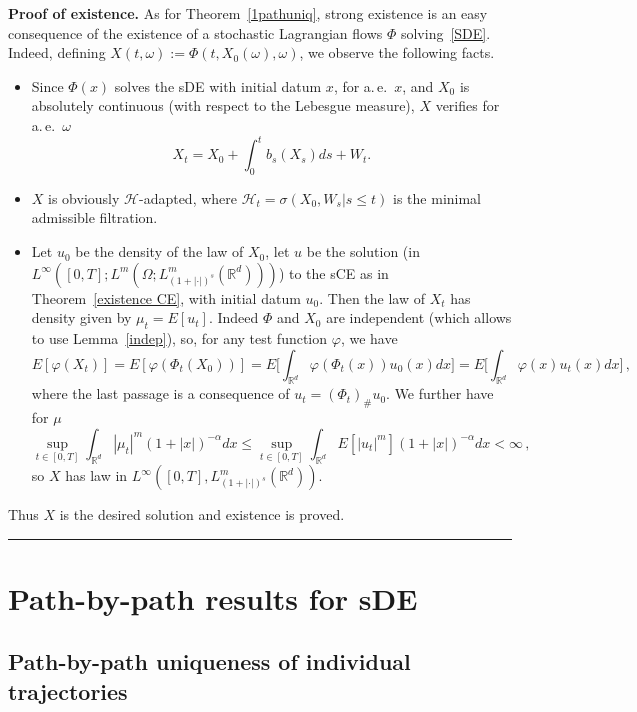 \documentclass[a4paper,10pt]{article}
\newenvironment{proof}[1][Proof]{\noindent\textbf{#1.} }{\ \rule{0.5em}{0.5em}}
\newcommand{\mr}{\mathbb{R}}
\newcommand{\mc}{\mathcal}
\begin{document}
\begin{proof}[Proof of existence]
As for Theorem~\ref{1pathuniq}, strong existence is an easy consequence of the existence of a stochastic Lagrangian flows $\Phi$ solving~\eqref{SDE}. Indeed, defining $X(t,\omega):=\Phi(t,X_0(\omega),\omega)$, we observe the following facts.
\begin{itemize}
\item Since $\Phi(x)$ solves the sDE with initial datum $x$, for a.\,e.\ $x$, and $X_0$ is absolutely continuous (with respect to the Lebesgue measure), $X$ verifies for a.\,e.\ $\omega$
\begin{equation*}
X_t=X_0+\int^t_0b_s (X_s)ds+W_t.
\end{equation*}
\item $X$ is obviously $\mc{H}$-adapted, where $\mc{H}_t=\sigma(X_0,W_s|s\le t)$ is the minimal admissible filtration.
\item Let $u_0$ be the density of the law of $X_0$, let $u$ be the solution (in $L^\infty([0,T];L^m(\Omega;L^m_{(1+|\cdot|)^s}(\mr^d)))$) to the sCE as in Theorem~\ref{existence CE}, with initial datum $u_0$. Then the law of $X_t$ has density given by $\mu_t=E[u_t]$. Indeed $\Phi$ and $X_0$ are independent (which allows to use Lemma~\ref{indep}), so, for any test function $\varphi$, we have
\begin{equation*}
E[\varphi(X_t)]=E[\varphi(\Phi_t(X_0))]=E\Big[\int_{\mr^d}\varphi(\Phi_t(x))u_0(x)dx\Big] =E\Big[\int_{\mr^d}\varphi(x)u_t(x)dx\Big]\, ,
\end{equation*}
where the last passage is a consequence of $u_t=(\Phi_t)_\#u_0$. We further have for $\mu$
\begin{equation*}
\sup_{t\in[0,T]}\int_{\mr^d}|\mu_t|^m(1+|x|)^{-\alpha}dx\le \sup_{t\in[0,T]}\int_{\mr^d}E[|u_t|^m](1+|x|)^{-\alpha}dx <\infty \, ,
\end{equation*}
so $X$ has law in $L^\infty([0,T],L^m_{(1+|\cdot|)^s}(\mr^d))$.
\end{itemize}
Thus $X$ is the desired solution and existence is proved.
\end{proof}


\section{Path-by-path results for sDE}

\subsection{Path-by-path uniqueness of individual trajectories}
\end{document}
